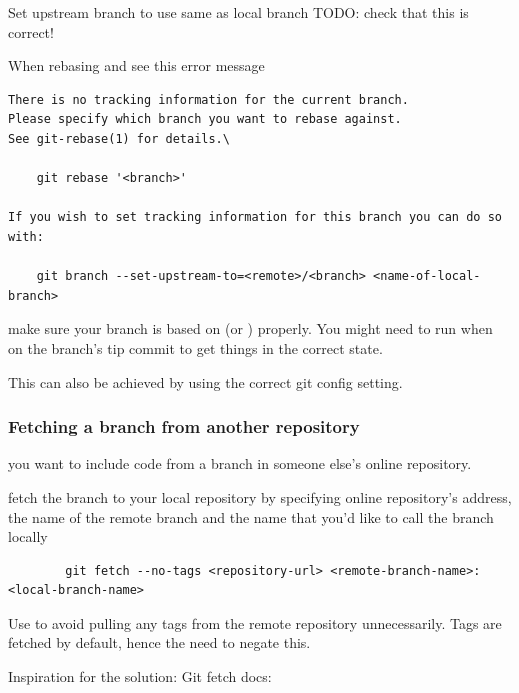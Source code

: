 \documentclass{git_course}
\begin{document}
\begin{frame}[fragile]{Set upstream branch to use same as local branch}
    TODO: check that this is correct!

When rebasing and see this error message
\begin{verbatim}
There is no tracking information for the current branch.
Please specify which branch you want to rebase against.
See git-rebase(1) for details.\

    git rebase '<branch>'

If you wish to set tracking information for this branch you can do so with:

    git branch --set-upstream-to=<remote>/<branch> <name-of-local-branch>
\end{verbatim}

    make sure your branch is based on  (or )
    properly.  You might need to run  when on the
    branch's tip commit to get things in the correct state.

    This can also be achieved by using the correct git config setting.
\end{frame}

\begin{frame}[fragile]
    \frametitle{Fetching a branch from another repository}
     you want to include code from a branch in someone else's
        online repository.

     fetch the branch to your local repository by specifying
        online repository's address, the name of the remote branch and the
        name that you'd like to call the branch locally
    \begin{verbatim}
        git fetch --no-tags <repository-url> <remote-branch-name>:<local-branch-name>
    \end{verbatim}

    Use  to avoid pulling any tags from the remote
    repository unnecessarily.  Tags are fetched by default, hence the need
    to negate this.

    Inspiration for the solution:
    Git fetch docs:
\end{frame}
\end{document}
